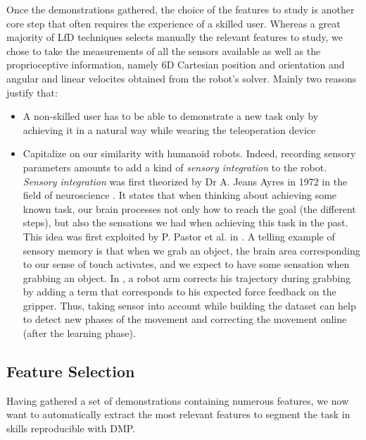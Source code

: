 \documentclass[conference]{IEEEtran}
\begin{document}
Once the demonstrations gathered, the choice of the features to study is another core step that often requires the experience of a skilled user. Whereas a great majority of LfD techniques selects manually the relevant features to study, we chose to take the measurements of all the sensors available as well as the proprioceptive information, namely 6D Cartesian position and orientation and angular and linear velocites obtained from the robot's solver. Mainly two reasons justify that:

 \begin{itemize}
     \item A non-skilled user has to be able to demonstrate a new task only by achieving it in a  natural way while wearing the teleoperation device
     \item Capitalize on our similarity with humanoid robots. Indeed, recording sensory parameters amounts to add a kind of \textit{sensory integration} to the robot. \textit{Sensory integration} was first theorized by Dr A. Jeans Ayres in 1972 in the field of neuroscience \cite{ayres_improving_1972}. It states that when thinking about achieving some known task, our brain processes not only how to reach the goal (the different steps), but also the sensations we had when achieving this task in the past. This idea was first exploited by P. Pastor et al. in \cite{sensory_skill}. A telling example of sensory memory is that when we grab an object, the brain area corresponding to our sense of touch activates, and we expect to have some sensation when grabbing an object. In \cite{sensory_skill}, a robot arm corrects his trajectory during grabbing by adding a term that corresponds to his expected force feedback on the gripper. Thus, taking sensor into account while building the dataset can help to detect new phases of the movement \cite{sensory_seg} and correcting the movement online (after the learning phase). \newline

\end{itemize}


\subsection{Feature Selection} \label{feature_selection}

Having gathered a set of demonstrations containing numerous features, we now want to automatically extract the most relevant features to segment the task in skills reproducible with DMP.
\end{document}
